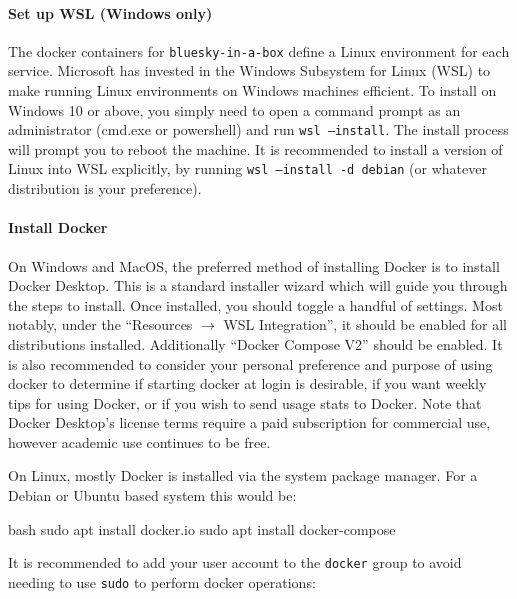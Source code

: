 \paragraph{Set up WSL (Windows only)}

The docker containers for \texttt{bluesky-in-a-box} define a Linux\cite{} environment for each service.
Microsoft has invested in the Windows Subsystem for Linux (WSL)\cite{} to make running Linux environments on Windows machines efficient.
To install on Windows 10 or above, you simply need to open a command prompt as an administrator (cmd.exe or powershell) and run \texttt{wsl --install}.
The install process will prompt you to reboot the machine.
It is recommended to install a version of Linux into WSL explicitly, by running \texttt{wsl --install -d debian} (or whatever distribution is your preference).

\paragraph{Install Docker}

On Windows and MacOS, the preferred method of installing Docker is to install Docker Desktop\cite{}.
This is a standard installer wizard which will guide you through the steps to install.
Once installed, you should toggle a handful of settings.
Most notably, under the ``Resources $\rightarrow$ WSL Integration'', it should be enabled for all distributions installed.
Additionally ``Docker Compose V2'' should be enabled.
It is also recommended to consider your personal preference and purpose of using docker to determine if starting docker at login is desirable, if you want weekly tips for using Docker, or if you wish to send usage stats to Docker.
Note that Docker Desktop's license terms require a paid subscription for commercial use, however academic use continues to be free.

On Linux, mostly Docker is installed via the system package manager.
For a Debian or Ubuntu based system this would be:

\begin{codefragment}{bash}
sudo apt install docker.io
sudo apt install docker-compose
\end{codefragment}

It is recommended to add your user account to the \texttt{docker} group to avoid needing to use \texttt{sudo} to perform docker operations:


